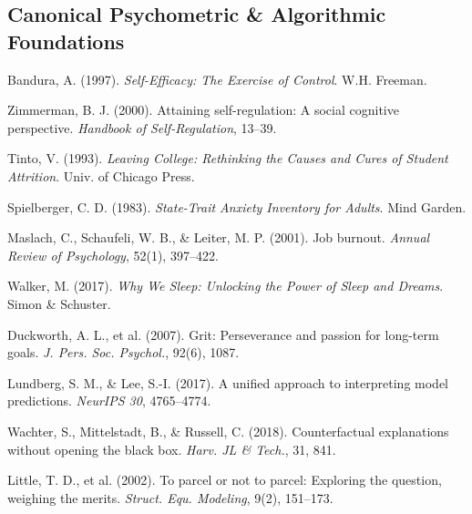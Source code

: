 \documentclass[10pt,a4paper]{article}
\begin{document}
\subsection{Canonical Psychometric \& Algorithmic Foundations}
\begin{enumerate}[label={[\arabic*]}, leftmargin=2em, itemsep=2pt]
  \item Bandura, A. (1997). \textit{Self-Efficacy: The Exercise of Control}. W.H. Freeman.
  \item Zimmerman, B. J. (2000). Attaining self-regulation: A social cognitive perspective. \textit{Handbook of Self-Regulation}, 13--39.
  \item Tinto, V. (1993). \textit{Leaving College: Rethinking the Causes and Cures of Student Attrition}. Univ. of Chicago Press.
  \item Spielberger, C. D. (1983). \textit{State-Trait Anxiety Inventory for Adults}. Mind Garden.
  \item Maslach, C., Schaufeli, W. B., \& Leiter, M. P. (2001). Job burnout. \textit{Annual Review of Psychology}, 52(1), 397--422.
  \item Walker, M. (2017). \textit{Why We Sleep: Unlocking the Power of Sleep and Dreams}. Simon \& Schuster.
  \item Duckworth, A. L., et al. (2007). Grit: Perseverance and passion for long-term goals. \textit{J. Pers. Soc. Psychol.}, 92(6), 1087.
  \item Lundberg, S. M., \& Lee, S.-I. (2017). A unified approach to interpreting model predictions. \textit{NeurIPS 30}, 4765--4774.
  \item Wachter, S., Mittelstadt, B., \& Russell, C. (2018). Counterfactual explanations without opening the black box. \textit{Harv. JL \& Tech.}, 31, 841.
  \item Little, T. D., et al. (2002). To parcel or not to parcel: Exploring the question, weighing the merits. \textit{Struct. Equ. Modeling}, 9(2), 151--173.
\end{enumerate}
\end{document}
